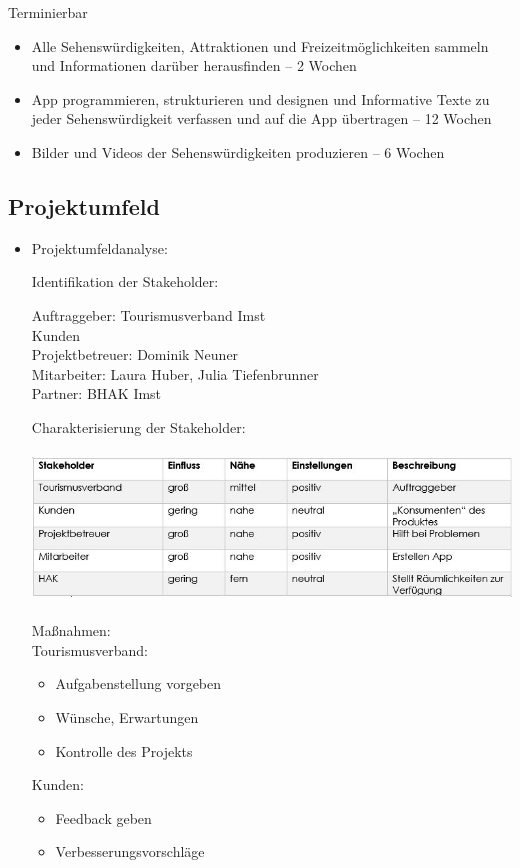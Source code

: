 Terminierbar
\begin{itemize}
\item Alle Sehenswürdigkeiten, Attraktionen und Freizeitmöglichkeiten sammeln und Informationen darüber herausfinden – 2 Wochen 
\item App programmieren, strukturieren und designen und Informative Texte zu jeder Sehenswürdigkeit verfassen und auf die App übertragen –  12 Wochen
\item Bilder und Videos der Sehenswürdigkeiten produzieren – 6 Wochen
\end{itemize}

\subsection{Projektumfeld}
\begin{itemize}
	
	\item Projektumfeldanalyse:
	
	Identifikation der Stakeholder:
	
	Auftraggeber: Tourismusverband Imst\\	
	Kunden\\	
	Projektbetreuer: Dominik Neuner	\\
	Mitarbeiter: Laura Huber, Julia Tiefenbrunner\\	
	Partner: BHAK Imst
	
	Charakterisierung der Stakeholder:
	
	\includegraphics[height=4cm]{Stakeholder}
	
	Maßnahmen:\\
	Tourismusverband:
	\begin{itemize}
			\item Aufgabenstellung vorgeben
			\item Wünsche, Erwartungen
			\item Kontrolle des Projekts\\
	\end{itemize}
	
	Kunden:
	\begin{itemize}
	\item Feedback geben
	\item Verbesserungsvorschläge\\
	\end{itemize}
	

\end{itemize}
